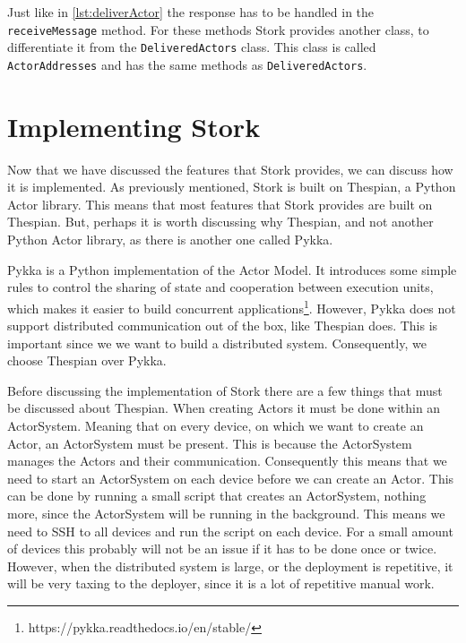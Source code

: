 \documentclass[a4paper]{article}
\begin{document}
Just like in \ref{lst:deliverActor} the response has to be handled in the \lstinline{receiveMessage} method. For these methods Stork provides another class, to differentiate it from the \lstinline|DeliveredActors| class. This class is called \lstinline|ActorAddresses| and has the same methods as \lstinline|DeliveredActors|.
\section{Implementing Stork}
Now that we have discussed the features that Stork provides, we can discuss how it is implemented. As previously mentioned, Stork is built on Thespian, a Python Actor library. This means that most features that Stork provides are built on Thespian. But, perhaps it is worth discussing why Thespian, and not another Python Actor library, as there is another one called Pykka.

Pykka is a Python implementation of the Actor Model. It introduces some simple rules to control the sharing of state and cooperation between execution units, which makes it easier to build concurrent applications\footnote{https://pykka.readthedocs.io/en/stable/}. However, Pykka does not support distributed communication out of the box, like Thespian does. This is important since we we want to build a distributed system. Consequently, we choose Thespian over Pykka.

Before discussing the implementation of Stork there are a few things that must be discussed about Thespian. When creating Actors it must be done within an ActorSystem. Meaning that on every device, on which we want to create an Actor, an ActorSystem must be present. This is because the ActorSystem manages the Actors and their communication. Consequently this means that we need to start an ActorSystem on each device before we can create an Actor. This can be done by running a small script that creates an ActorSystem, nothing more, since the ActorSystem will be running in the background. This means we need to SSH to all devices and run the script on each device. For a small amount of devices this probably will not be an issue if it has to be done once or twice. However, when the distributed system is large, or the deployment is repetitive, it will be very taxing to the deployer, since it is a lot of repetitive manual work.
\end{document}
